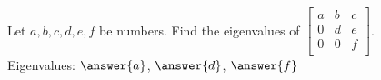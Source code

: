 \documentclass{ximera}
\begin{document}

\begin{exercise}
    Let $a,b,c,d,e,f$ be numbers.  Find the eigenvalues of
    $\left[ 
        \begin{smallmatrix}
            a & b & c \\
            0 & d & e \\
            0 & 0 & f \\
        \end{smallmatrix} 
    \right]$.\\
    Eigenvalues: $\answer{a}$, $\answer{d}$, $\answer{f}$
\end{exercise}
\end{document}

